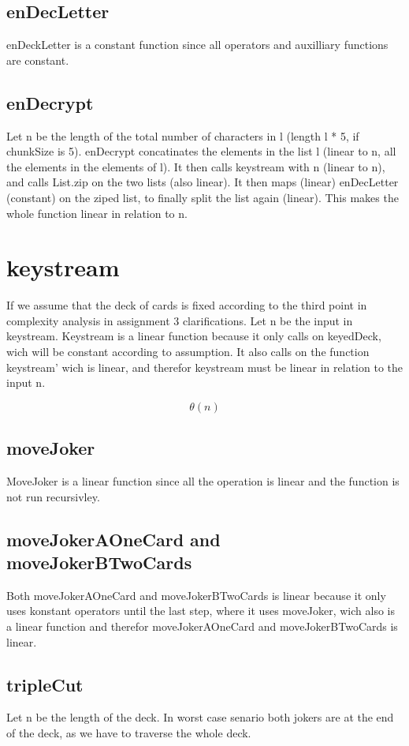 \documentclass[12pt, a4paper]{article}
\begin{document}
\subsection{enDecLetter}
enDeckLetter is a constant function since all operators and auxilliary functions are constant.

\subsection{enDecrypt}
Let n be the length of the total number of characters in l (length l * 5, if chunkSize is 5). enDecrypt concatinates the elements in the list l (linear to n, all the elements in the elements of l). It then calls keystream with n (linear to n), and calls List.zip on the two lists (also linear). It then maps (linear) enDecLetter (constant) on the ziped list, to finally split the list again (linear). This makes the whole function linear in relation to n.


\section{keystream}
If we assume that the deck of cards is fixed according to the third point in complexity analysis in assignment 3 clarifications. Let n be the input in keystream.
Keystream is a linear function because it only calls on keyedDeck, wich will be constant according to assumption. It also calls on the function keystream' wich is linear, and therefor keystream must be linear in relation to the input n.

$$ \theta(n)$$

\subsection{moveJoker}
MoveJoker is a linear function since all the operation is linear and the function is not run recursivley.

\subsection{moveJokerAOneCard and moveJokerBTwoCards}
Both moveJokerAOneCard and moveJokerBTwoCards is linear because it only uses konstant operators until the last step, where it uses moveJoker, wich also is a linear function and therefor moveJokerAOneCard and moveJokerBTwoCards is linear.

\subsection{tripleCut}
Let n be the length of the deck. In worst case senario both jokers are at the end of the deck, as we have to traverse the whole deck.
\end{document}
